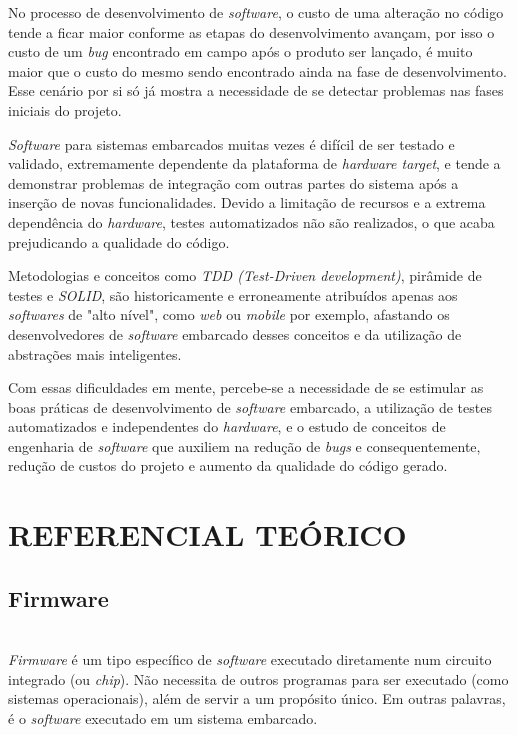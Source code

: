 \documentclass[times, twoside, watermark]{artigo}
\begin{document}
No processo de desenvolvimento de \textit{software}, o custo de uma alteração no
código tende a ficar maior conforme  as etapas do desenvolvimento avançam, por isso
o custo de um \textit{bug} encontrado em campo após o produto ser lançado, é muito
maior que o custo do mesmo sendo encontrado ainda na fase de
desenvolvimento\cite{firmwarecost}.
Esse cenário por si só já mostra a necessidade de se detectar problemas nas fases
iniciais do projeto.

\textit{Software} para sistemas embarcados muitas vezes é difícil de ser testado e
validado, extremamente dependente da plataforma de \textit{hardware target}, e
tende a demonstrar problemas de integração com outras
partes do sistema após a inserção de novas funcionalidades.
Devido a limitação de recursos e a extrema dependência do \textit{hardware}, testes
automatizados não são realizados, o que acaba prejudicando a qualidade do código.

Metodologias e conceitos como \textit{TDD (Test-Driven development)}, pirâmide de
testes e \textit{SOLID}, são historicamente e erroneamente atribuídos apenas
aos \textit{softwares} de "alto nível", como \textit{web} ou
\textit{mobile} por exemplo, afastando os desenvolvedores de \textit{software}
embarcado desses conceitos e da utilização de abstrações mais inteligentes.

Com essas dificuldades em mente, percebe-se a necessidade de se estimular as boas
práticas de desenvolvimento de \textit{software} embarcado, a utilização de testes
automatizados e independentes do \textit{hardware}, e o estudo de conceitos de
engenharia de \textit{software} que auxiliem na
redução de \textit{bugs} e consequentemente, redução de custos do projeto e aumento
da qualidade do código gerado. \hfill\\




\section{REFERENCIAL TEÓRICO}

\subsection{Firmware}\hfill\\

\textit{Firmware} é um tipo específico de \textit{software} executado diretamente
num circuito integrado (ou \textit{chip}).
Não necessita de outros programas para ser executado (como sistemas operacionais),
além de servir a um propósito único.
Em outras palavras, é o \textit{software} executado em um sistema
embarcado\cite{ganssle2004firmware}.
\end{document}
